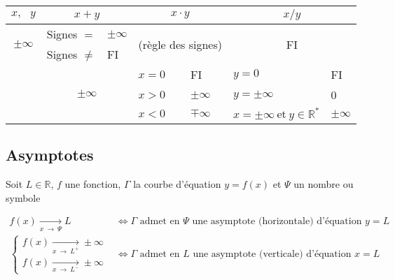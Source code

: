 \documentclass{article}
\newcommand{\R}{\mathds{R}}
\newcommand{\twoRows}[1]{\multirow{2}{*}{#1}}
\newcommand{\threeRows}[1]{\multirow{3}{*}{#1}}
\newcommand{\twoCols}[1]{\multicolumn{2}{c|}{#1}}
\newcommand{\twoColsNB}[1]{\multicolumn{2}{c}{#1}}
\newcommand{\goesto}[2]{\xrightarrow[#1\:\to\:#2]{}}
\newcommand{\et}{\:\text{et}\:}
\begin{document}
\begin{table}[H]
\centering
\begin{tabular}{c||ll|ll|ll}

$x,\:\:\: y$                             & \multicolumn{2}{c}{$x+y$}     & \multicolumn{2}{c}{$x\cdot y$}           & \multicolumn{2}{c}{$x/y$}              \\
\hline\hline
\twoRows{$\pm\infty$}                       & Signes $=$     & $\pm\infty$     & \twoCols{\twoRows{(règle des signes)}}   & \twoColsNB{\twoRows{FI}}               \\
                                         & Signes $\not=$ & FI           &                                          &                                   \\
\hline
\twoRows{\threeRows{$\R$ ou $\pm\infty$}}   & \twoCols{\threeRows{$\pm\infty$}}& $x = 0$          & FI                    & $y = 0$       & FI                     \\
                                         &                               && $x > 0$          & $\pm\infty$              & $y= \pm\infty$   & 0                      \\
                                         &                               && $x < 0$          & $\mp\infty$              & $x = \pm\infty \et y \in \R^\ast$  & $\pm\infty$               \\

\end{tabular}
\end{table}

\subsection{Asymptotes}

Soit $L \in \R$, $f$ une fonction, $\Gamma$ la courbe d'équation $y = f(x)$ et $\Psi$ un nombre ou symbole

\begin{equation*}
    \begin{split}
        f(x) \goesto{x}{\Psi} L &\iff \text{$\Gamma$ admet en $\Psi$ une asymptote (horizontale) d'équation $y = L$}\\
        \begin{cases}
            f(x) \goesto{x}{L^+} \pm\infty\\
            f(x) \goesto{x}{L^-} \pm\infty
        \end{cases} &\iff \text{$\Gamma$ admet en $L$ une asymptote (verticale) d'équation $x = L$}
    \end{split}
\end{equation*}
\end{document}
